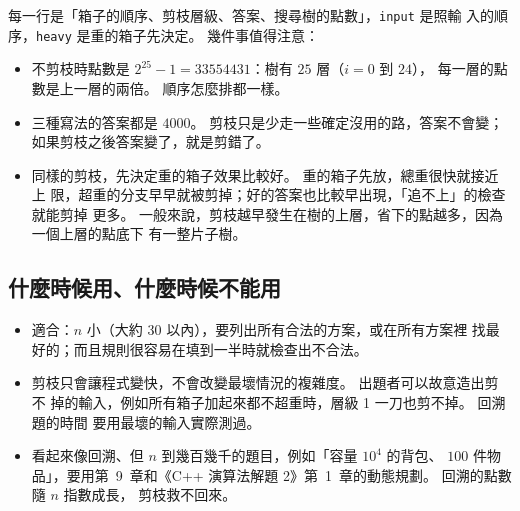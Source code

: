 
每一行是「箱子的順序、剪枝層級、答案、搜尋樹的點數」，\texttt{input} 是照輸
入的順序，\texttt{heavy} 是重的箱子先決定。 幾件事值得注意：

\begin{itemize}
\item 不剪枝時點數是 $2^{25} - 1 = 33554431$：樹有 $25$ 層（$i = 0$ 到 $24$），
每一層的點數是上一層的兩倍。 順序怎麼排都一樣。
\item 三種寫法的答案都是 $4000$。 剪枝只是少走一些確定沒用的路，答案不會變；
如果剪枝之後答案變了，就是剪錯了。
\item 同樣的剪枝，先決定重的箱子效果比較好。 重的箱子先放，總重很快就接近上
限，超重的分支早早就被剪掉；好的答案也比較早出現，「追不上」的檢查就能剪掉
更多。 一般來說，剪枝越早發生在樹的上層，省下的點越多，因為一個上層的點底下
有一整片子樹。
\end{itemize}

\subsection{什麼時候用、什麼時候不能用}

\begin{itemize}
\item 適合：$n$ 小（大約 $30$ 以內），要列出所有合法的方案，或在所有方案裡
找最好的；而且規則很容易在填到一半時就檢查出不合法。
\item 剪枝只會讓程式變快，不會改變最壞情況的複雜度。 出題者可以故意造出剪不
掉的輸入，例如所有箱子加起來都不超重時，層級 1 一刀也剪不掉。 回溯題的時間
要用最壞的輸入實際測過。
\item 看起來像回溯、但 $n$ 到幾百幾千的題目，例如「容量 $10^4$ 的背包、
$100$ 件物品」，要用第~9~章和《C++ 演算法解題 2》第~1~章的動態規劃。 回溯的點數隨 $n$ 指數成長，
剪枝救不回來。
\end{itemize}

